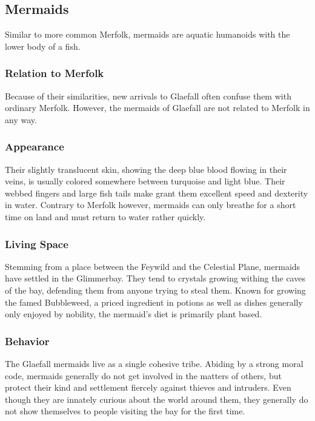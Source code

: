 \subsection{Mermaids}

Similar to more common Merfolk, mermaids are aquatic humanoids with the lower body of a fish.

\subsubsection{Relation to Merfolk}
Because of their similarities, new arrivals to Glaefall often confuse them with ordinary Merfolk.
However, the mermaids of Glaefall are not related to Merfolk in any way.

\subsubsection{Appearance}
Their slightly translucent skin, showing the deep blue blood flowing in their veins, is usually colored somewhere between turquoise and light blue.
Their webbed fingers and large fish tails make grant them excellent speed and dexterity in water.
Contrary to Merfolk however, mermaids can only breathe for a short time on land and must return to water rather quickly.

\subsubsection{Living Space}
Stemming from a place between the Feywild and the Celestial Plane, mermaids have settled in the Glimmerbay.
They tend to crystals growing withing the caves of the bay, defending them from anyone trying to steal them.
Known for growing the famed Bubbleweed, a priced ingredient in potions as well as dishes generally only enjoyed by nobility, the mermaid's diet is primarily plant based.

\subsubsection{Behavior}
The Glaefall mermaids live as a single cohesive tribe.
Abiding by a strong moral code, mermaids generally do not get involved in the matters of others, but protect their kind and settlement fiercely against thieves and intruders.
Even though they are innately curious about the world around them, they generally do not show themselves to people visiting the bay for the first time.

